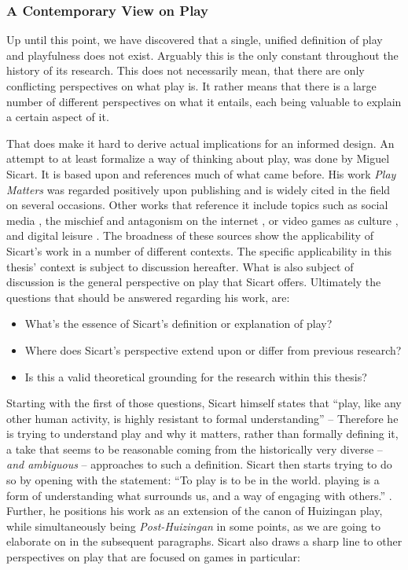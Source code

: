 \subsubsection{A Contemporary View on Play}

Up until this point, we have discovered that a single, unified definition of play and playfulness does not exist. Arguably this is the only constant throughout the history of its research. This does not necessarily mean, that there are only conflicting perspectives on what play is. It rather means that there is a large number of different perspectives on what it entails, each being valuable to explain a certain aspect of it.

That does make it hard to derive actual implications for an informed design. An attempt to at least formalize a way of thinking about play, was done by Miguel Sicart. It is based upon and references much of what came before. His work \textit{Play Matters} was regarded positively upon publishing and is widely cited in the field on several occasions. Other works that reference it include topics such as social media \cite{hjorth2019understanding}, the mischief and antagonism on the internet \cite{phillips2018ambivalent}, or video games as culture \cite{daniel2018video}, and digital leisure \cite{spracklen2015digital}. The broadness of these sources show the applicability of Sicart's work in a number of different contexts. The specific applicability in this thesis' context is subject to discussion hereafter. What is also subject of discussion is the general perspective on play that Sicart offers. Ultimately the questions that should be answered  regarding his work, are:


\begin{itemize}
  \item{What's the essence of Sicart's definition or explanation of play?}
  \item{Where does Sicart's perspective extend upon or differ from previous research?}
  \item{Is this a valid theoretical grounding for the research within this thesis?}
\end{itemize}

Starting with the first of those questions, Sicart himself states that \enquote{play, like any other human activity, is highly resistant to formal understanding} \cite[p. 2]{sicart2014play} -- Therefore he is trying to understand play and why it matters, rather than formally defining it, a take that seems to be reasonable coming from the historically very diverse -- \textit{and ambiguous} -- approaches to such a definition. Sicart then starts trying to do so by opening with the statement: \enquote{To play is to be in the world. playing is a form of understanding what surrounds us, and a way of engaging with others.} \cite[p. 1]{sicart2014play}. Further, he positions his work as an extension of the canon of Huizingan play, while simultaneously being \textit{Post-Huizingan} in some points, as we are going to elaborate on in the subsequent paragraphs. Sicart also draws a sharp line to other perspectives on play that are focused on games in particular:

